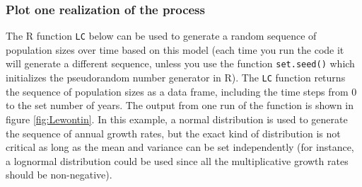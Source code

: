 \documentclass[
]{book}
\begin{document}
\hypertarget{plot-one-realization-of-the-process}{%
\subsubsection*{Plot one realization of the process}\label{plot-one-realization-of-the-process}}

The R function \texttt{LC} below can be used to generate a random sequence of population sizes over time based on this model (each time you run the code it will generate a different sequence, unless you use the function \texttt{set.seed()} which initializes the pseudorandom number generator in R). The \texttt{LC} function returns the sequence of population sizes as a data frame, including the time steps from 0 to the set number of years. The output from one run of the function is shown in figure \ref{fig:Lewontin}. In this example, a normal distribution is used to generate the sequence of annual growth rates, but the exact kind of distribution is not critical as long as the mean and variance can be set independently (for instance, a lognormal distribution could be used since all the multiplicative growth rates should be non-negative).
\end{document}
